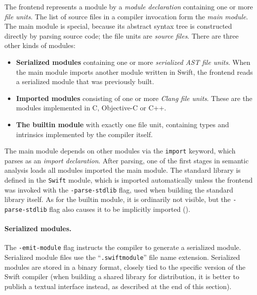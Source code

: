 \documentclass[../generics]{subfiles}
\begin{document}
The frontend represents a module by a \emph{module declaration} containing one or more \emph{file units}. The list of source files in a compiler invocation form the \emph{main module}. The main module is special, because its abstract syntax tree is constructed directly by parsing source code; the file units are \emph{source files}. There are three other kinds of modules:
\begin{itemize}
\item \textbf{Serialized modules} containing one or more \emph{serialized AST file units}. When the main module imports another module written in Swift, the frontend reads a serialized module that was previously built.

\item \textbf{Imported modules} consisting of one or more \emph{Clang file units}. These are the modules implemented in C, Objective-C or C++.

\item \textbf{The builtin module} with exactly one file unit, containing types and intrinsics implemented by the compiler itself.
\end{itemize}
The main module depends on other modules via the \texttt{import} keyword, which parses as an \emph{import declaration}. After parsing, one of the first stages in semantic analysis loads all modules imported the main module. The standard library is defined in the \texttt{Swift} module, which is imported automatically unless the frontend was invoked with the \texttt{-parse-stdlib} flag, used when building the standard library itself. As for the builtin module, it is ordinarily not visible, but the \texttt{-parse-stdlib} flag also causes it to be implicitly imported ().

\paragraph{Serialized modules.} The \texttt{-emit-module} flag instructs the compiler to generate a serialized module. Serialized module files use the ``\texttt{.swiftmodule}'' file name extension. Serialized modules are stored in a binary format, closely tied to the specific version of the Swift compiler (when building a shared library for distribution, it is better to publish a textual interface instead, as described at the end of this section).
\end{document}
